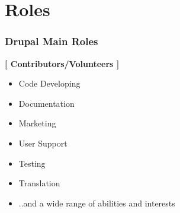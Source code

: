 \section{Roles}

\begin{frame}[allowframebreaks]
\frametitle{Drupal Main Roles}

\textbf{[ Contributors/Volunteers ]}

    \begin{itemize}
    	\item Code Developing
    	\item Documentation
    	\item Marketing
    	\item User Support
    	\item Testing
    	\item Translation
    	\item ..and a wide range of abilities and interests
	\end{itemize}
\end{frame}

